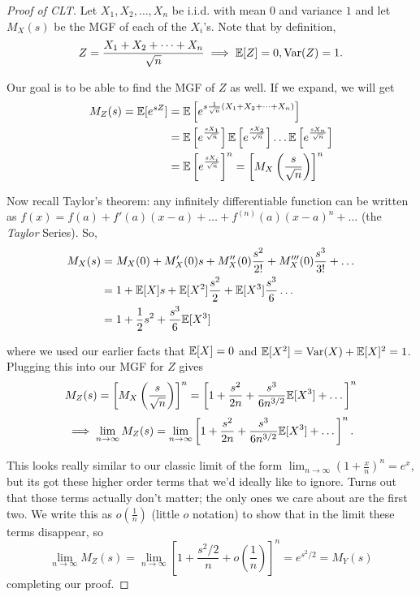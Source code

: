 \documentclass[11 pt]{scrartcl}
\begin{document}
\begin{proof}[Proof of CLT]
Let $X_1, X_2, \dots, X_n$ be i.i.d. with mean $0$ and variance $1$ and let $M_X(s)$ be the MGF of each of the $X_i$'s. Note that by definition, 
\[ Z = \dfrac{X_1 + X_2 + \dots + X_n}{\sqrt{n}} \implies \mathbb E[Z] = 0, \text{Var}(Z) = 1.\] 

Our goal is to be able to find the MGF of $Z$ as well. If we expand, we will get 
\begin{align*}
    M_Z(s) = \mathbb E[e^{sZ}] &= \mathbb E\left[e^{s\frac{1}{\sqrt{n}}(X_1 + X_2 + \dots + X_n)}\right] \\ 
                         &= \mathbb E\left[e^{\frac{sX_1}{\sqrt{n}}}\right] \mathbb E\left[e^{\frac{sX_2}{\sqrt{n}}}\right]\dots  \mathbb E\left[e^{\frac{sX_n}{\sqrt{n}}}\right] \\ 
                         &= \mathbb E\left[e^{\frac{sX_i}{\sqrt{n}}}\right]^n = \left[M_X\left(\frac{s}{\sqrt{n}}\right)\right]^n 
\end{align*}

Now recall Taylor's theorem: any infinitely differentiable function can be written as $f(x) = f(a) + f'(a)(x-a) + \dots + f^{(n)}(a)(x-a)^n + \dots$ (the \emph{Taylor} Series). So, 
\begin{align*}
    M_X(s) &= M_X(0) + M_X'(0)s + M_X''(0)\dfrac{s^2}{2!} + M_X'''(0)\dfrac{s^3}{3!}+\dots\\ 
           &= 1 + \mathbb E[X]s + \mathbb E[X^2]\dfrac{s^2}{2} + \mathbb E[X^3]\dfrac{s^3}{6}\dots \\ 
           &= 1 + \dfrac{1}{2}s^2 + \dfrac{s^3}{6}\mathbb E[X^3] 
\end{align*}

where we used our earlier facts that $\mathbb E[X] = 0$ and $\mathbb E[X^2] = \text{Var}(X)+\mathbb E[X]^2 = 1$. Plugging this into our MGF for $Z$ gives 
\[ M_Z(s) = \left[M_X\left(\frac{s}{\sqrt{n}}\right)\right]^n = \left[1 + \dfrac{s^2}{2n} + \dfrac{s^3}{6n^{3/2}}\mathbb E[X^3] + \dots \right]^n\]  
\[ \implies \lim_{n\to\infty} M_Z(s) = \lim_{n\to\infty} \left[ 1 + \dfrac{s^2}{2n} + \dfrac{s^3}{6n^{3/2}}\mathbb E[X^3] + \dots \right]^n.\] 

This looks really similar to our classic limit of the form $\lim_{n\to\infty}(1+\frac{x}{n})^n = e^x$, but its got these higher order terms that we'd ideally like to ignore. Turns out that those terms actually don't matter; the only ones we care about are the first two. We write this as $o(\frac{1}{n})$ (little $o$ notation) to show that in the limit these terms disappear, so 
\[ \lim_{n\to\infty} M_Z(s) = \lim_{n\to\infty} \left[1+\dfrac{s^2/2}{n} + o\left(\dfrac{1}{n}\right)\right]^n = e^{s^2/2} = M_Y(s)\] 
completing our proof. 
\end{proof}
\end{document}

